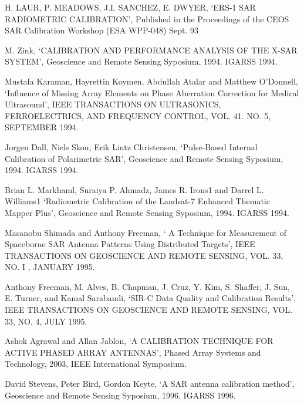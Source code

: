 \documentclass[a4paper,10pt]{article}
\begin{document}
\begin{enumerate}[ {[}1{]} ]
		\item \label{ppr:rad2} H. LAUR, P. MEADOWS, J.I. SANCHEZ, E. DWYER, 
		\enquote*{ERS-1 SAR RADIOMETRIC CALIBRATION}, Published in the 
		Proceedings of the CEOS SAR Calibration Workshop (ESA WPP-048) Sept. 93
		
		\item \label{ppr:classic2} M. Zink, \enquote*{CALIBRATION AND 
		PERFORMANCE ANALYSIS OF THE X-SAR SYSTEM}, Geoscience and Remote Sensing
		Syposium, 1994. IGARSS 1994.
		
		\item Mustafa Karaman, Hayrettin Koymen, Abdullah Atalar and Matthew 
		O’Donnell, \enquote*{Influence of Missing Array Elements on Phase 
		Aberration Correction for Medical Ultrasound}, IEEE TRANSACTIONS ON
		ULTRASONICS, FERROELECTRICS, AND FREQUENCY CONTROL, VOL. 41. NO. 5, 
		SEPTEMBER 1994.
		
		\item \label{ppr:classic3} Jorgen Dall, Niels Skou, Erik Lintz 
		Christensen, \enquote*{Pulse-Based Internal Calibration of Polarimetric
		SAR}, Geoscience and Remote Sensing Syposium, 1994. IGARSS 1994.

		\item \label{ppr:rad3} Brian L. Markhaml, Suraiya P. Ahmadz, James R. 
		Irons1 and Darrel L. Williams1 \enquote*{Radiometric Calibration of the
		Landsat-7 Enhanced Thematic Mapper Plus}, Geoscience and Remote Sensing
		Syposium, 1994. IGARSS 1994.
		
		\item \label{ppr:dist1} Masanobu Shimada and Anthony Freeman, \enquote*{
		A Technique for Measurement of Spaceborne SAR Antenna Patterns Using 
		Distributed Targets}, IEEE TRANSACTIONS ON GEOSCIENCE AND REMOTE 
		SENSING, VOL. 33, NO. I , JANUARY 1995.
		
		\item \label{ppr:abs-rad-ical1}Anthony Freeman, M. Alves, B. Chapman, J.
		Cruz, Y. Kim, S. Shaffer, J. Sun, E. Turner, and Kamal Sarabandi, 
		\enquote*{SIR-C Data Quality and Calibration Results}, IEEE TRANSACTIONS
		ON GEOSCIENCE AND REMOTE SENSING, VOL. 33, NO. 4, JULY 1995.
		
		\item \label{ppr:mutual1} Ashok Agrawal and Allan Jablon, \enquote*{A 
		CALIBRATION TECHNIQUE FOR ACTIVE PHASED ARRAY ANTENNAS}, Phased Array 
		Systems and Technology, 2003, IEEE International Symposium.
		
		\item \label{ppr:puncTrgt2} David Stevens, Peter Bird, Gordon Keyte, 
		\enquote*{A SAR antenna calibration method}, Geoscience and Remote 
		Sensing Syposium, 1996. IGARSS 1996.
		

\end{enumerate}
\end{document}
